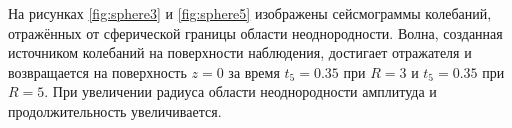 \documentclass[a4paper, fontsize=14pt]{article}
\begin{document}
	На рисунках \ref{fig:sphere3} и \ref{fig:sphere5} изображены сейсмограммы  колебаний, отражённых от сферической границы области неоднородности.
	Волна, созданная источником колебаний на поверхности наблюдения, достигает отражателя и возвращается на поверхность $z=0$ за время $t_5 = 0.35$ при $R=3$ и $t_5=0.35$ при $R=5$.
	При увеличении радиуса области неоднородности  амплитуда и продолжительность увеличивается. 
	  
	

\end{document}
